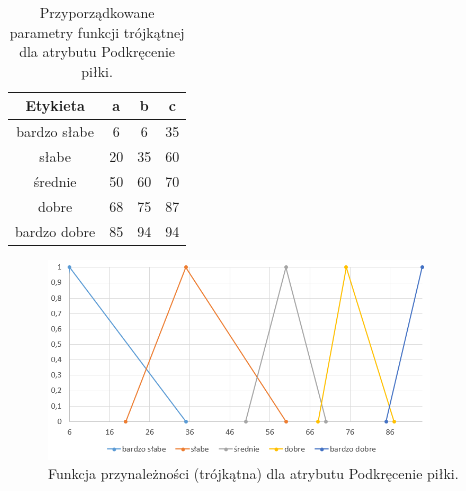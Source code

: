\documentclass{classrep}
\begin{document}
	\begin{table}[h!]
		\centering
		\begin{tabular} {c c c c}
			\hline
			\textbf{Etykieta} & \textbf{a} & \textbf{b} & \textbf{c} \\ [0.5ex] 
			\hline	
			\hline 
			bardzo słabe & 6 & 6 & 35 \\
			słabe & 20 & 35 & 60   \\
			średnie & 50 & 60 & 70  \\
			dobre & 68 & 75 & 87   \\
			bardzo dobre & 85 & 94 & 94  \\					
			\hline
		\end{tabular}
		\caption{Przyporządkowane parametry funkcji trójkątnej dla atrybutu Podkręcenie piłki. }
		\label{tabelaPodkrecenie}
	\end{table}
	
	\begin{figure}[h!]
		\centering
		\includegraphics[width=0.9\textwidth]{zmienne/7.png}
		\caption{Funkcja przynależności (trójkątna) dla atrybutu Podkręcenie piłki.}
		\label{wykresPodkrecenie}
	\end{figure}
	
	
	\newpage
\end{document}
